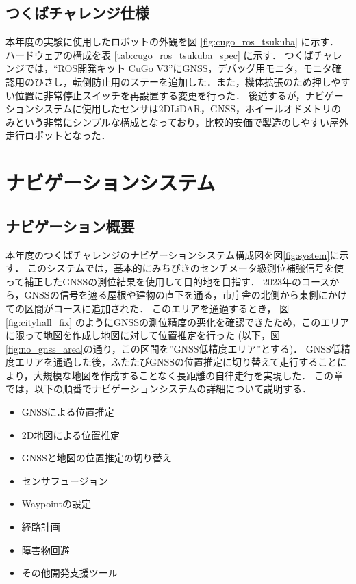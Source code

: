 \documentclass[platex,dvipdfmx]{rbproceedings}
\begin{document}
\subsection{つくばチャレンジ仕様}
本年度の実験に使用したロボットの外観を図 \ref{fig:cugo_ros_tsukuba} に示す．
ハードウェアの構成を表 \ref{tab:cugo_ros_tsukuba_spec} に示す．
つくばチャレンジでは，“ROS開発キット CuGo V3”にGNSS，デバッグ用モニタ，モニタ確認用のひさし，転倒防止用のステーを追加した．また，機体拡張のため押しやすい位置に非常停止スイッチを再設置する変更を行った．
後述するが，ナビゲーションシステムに使用したセンサは2DLiDAR，GNSS，ホイールオドメトリのみという非常にシンプルな構成となっており，比較的安価で製造のしやすい屋外走行ロボットとなった．

\section{ナビゲーションシステム}
\subsection{ナビゲーション概要}

本年度のつくばチャレンジのナビゲーションシステム構成図を図\ref{fig:system}に示す．
このシステムでは，基本的にみちびきのセンチメータ級測位補強信号を使って補正したGNSSの測位結果を使用して目的地を目指す．
2023年のコースから，GNSSの信号を遮る屋根や建物の直下を通る，市庁舎の北側から東側にかけての区間がコースに追加された．
このエリアを通過するとき， 図\ref{fig:cityhall_fix} のようにGNSSの測位精度の悪化を確認できたため，このエリアに限って地図を作成し地図に対して位置推定を行った
(以下，図\ref{fig:no_gnss_area}の通り，この区間を”GNSS低精度エリア”とする)．
GNSS低精度エリアを通過した後，ふたたびGNSSの位置推定に切り替えて走行することにより，大規模な地図を作成することなく長距離の自律走行を実現した．
この章では，以下の順番でナビゲーションシステムの詳細について説明する．

\begin{itemize}
    \item GNSSによる位置推定
    \item 2D地図による位置推定
    \item GNSSと地図の位置推定の切り替え
    \item センサフュージョン
    \item Waypointの設定
    \item 経路計画
    \item 障害物回避
    \item その他開発支援ツール
\end{itemize}
\end{document}
